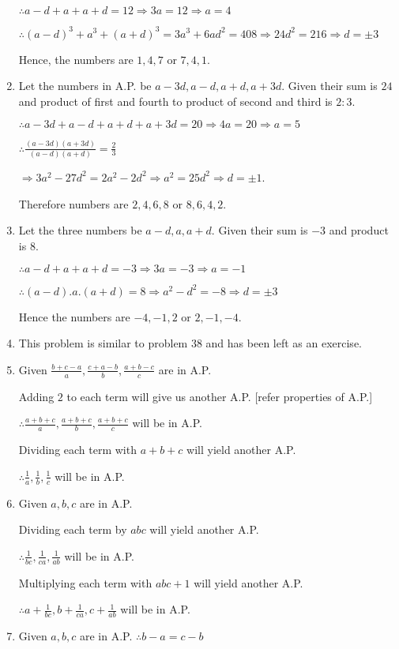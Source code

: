 \begin{enumerate}
  $\therefore a - d + a + a + d = 12 \Rightarrow 3a = 12 \Rightarrow a = 4$

  $\therefore (a - d)^3 + a^3 + (a + d)^3 = 3a^3 + 6ad^2 = 408 \Rightarrow 24d^2 = 216 \Rightarrow d = \pm 3$

  Hence, the numbers are $1, 4, 7$ or $7, 4, 1$.
\item Let the numbers in A.P. be $a - 3d, a - d, a + d, a + 3d$. Given their sum is $24$ and product of first and
  fourth to product of second and third is $2:3$.

  $\therefore a - 3d + a - d + a + d + a + 3d = 20 \Rightarrow 4a = 20 \Rightarrow a = 5$

  $\therefore \frac{(a - 3d)(a + 3d)}{(a - d)(a + d)} = \frac{2}{3}$

  $\Rightarrow 3a^2 - 27d^2 = 2a^2 - 2d^2 \Rightarrow a^2 = 25d^2 \Rightarrow d = \pm1$.

  Therefore numbers are $2, 4, 6, 8$ or $8, 6, 4, 2$.
\item Let the three numbers be $a - d, a, a + d$. Given their sum is $-3$ and product is $8$.

  $\therefore a - d + a + a + d = -3 \Rightarrow 3a = -3 \Rightarrow a = -1$

  $\therefore (a - d).a.(a + d) = 8 \Rightarrow a^2 - d^2 = -8 \Rightarrow d = \pm3$

  Hence the numbers are $-4, -1, 2$ or $2, -1, -4$.
\item This problem is similar to problem 38 and has been left as an exercise.
\item Given $\frac{b + c - a}{a}, \frac{c + a - b}{b}, \frac{a + b - c}{c}$ are in A.P.

  Adding $2$ to each term will give us another A.P. [refer properties of A.P.]

  $\therefore \frac{a + b + c}{a}, \frac{a + b + c}{b}, \frac{a + b + c}{c}$ will be in A.P.

  Dividing each term with $a + b + c$ will yield another A.P.

  $\therefore \frac{1}{a}, \frac{1}{b}, \frac{1}{c}$ will be in A.P.
\item Given $a, b, c$ are in A.P.

  Dividing each term by $abc$ will yield another A.P.

  $\therefore \frac{1}{bc}, \frac{1}{ca}, \frac{1}{ab}$ will be in A.P.

  Multiplying each term with $abc + 1$ will yield another A.P.

  $\therefore a + \frac{1}{bc}, b + \frac{1}{ca}, c + \frac{1}{ab}$ will be in A.P.
\item Given $a, b, c$ are in A.P. $\therefore b - a = c - b$


\end{enumerate}
